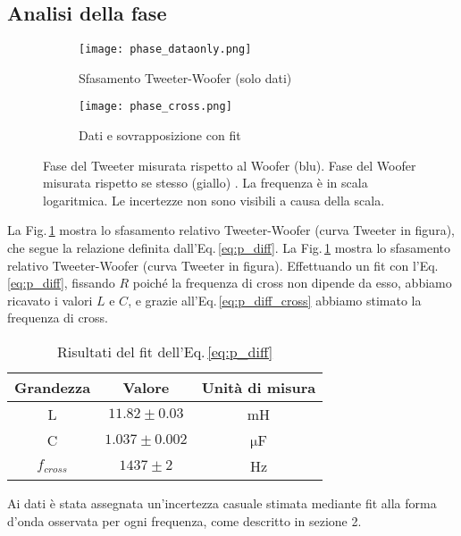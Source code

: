 \documentclass[../Relazione_circuiti]{subfiles}
\begin{document}
\subsection{Analisi della fase}

  \begin{figure}[H]
    \centering

    \begin{subfigure}{=0.5\textwidth}
      \centering
      \texttt{[image: phase\_dataonly.png]}

      \caption{Sfasamento Tweeter-Woofer (solo dati)}
      \label{fig: pdiff_dataonly}

    \end{subfigure}

    \begin{subfigure}{=0.5\textwidth}
      \centering
      \texttt{[image: phase\_cross.png]}

      \caption{Dati e sovrapposizione con fit}
      \label{fig: pdiff_fit_data}

    \end{subfigure}

    \caption{Fase del Tweeter misurata rispetto al Woofer (blu). Fase del Woofer misurata rispetto se stesso (giallo)
      . La frequenza è in scala logaritmica. Le incertezze non sono visibili a causa della scala.}
    \label{fig: phase_diff}

  \end{figure}

  La Fig.\,\ref{fig: pdiff_dataonly} mostra lo sfasamento relativo Tweeter-Woofer (curva Tweeter in figura), che segue la
  relazione definita dall'Eq.\,\eqref{eq:p_diff}.
  La Fig.\,\ref{fig: pdiff_dataonly} mostra lo sfasamento relativo Tweeter-Woofer (curva Tweeter in figura).
  Effettuando un fit con l'Eq.\,\eqref{eq:p_diff}, fissando $R$
      poiché la frequenza di cross non dipende da esso, abbiamo
      ricavato i valori $L$ e $C$, e grazie all'Eq.\,\eqref{eq:p_diff_cross} abbiamo stimato la frequenza di cross.


  \begin{table}[H]
    \centering

    \begin{tabular}{c | c | c}
      Grandezza   & Valore              & Unità di misura \\
      \hline
      L           & $ 11.82 \pm 0.03 $  & mH              \\
      C           & $ 1.037 \pm 0.002 $ & $\mathrm{\mu}$F \\
      $f_{cross}$ & $ 1437 \pm 2$       & Hz

    \end{tabular}
    \caption{Risultati del fit dell'Eq.\,\eqref{eq:p_diff}}
    \label{tab:fit_phase}

  \end{table}
  Ai dati è stata assegnata un'incertezza casuale stimata mediante fit alla forma d'onda osservata per ogni frequenza,
  come descritto in sezione 2.
\end{document}
